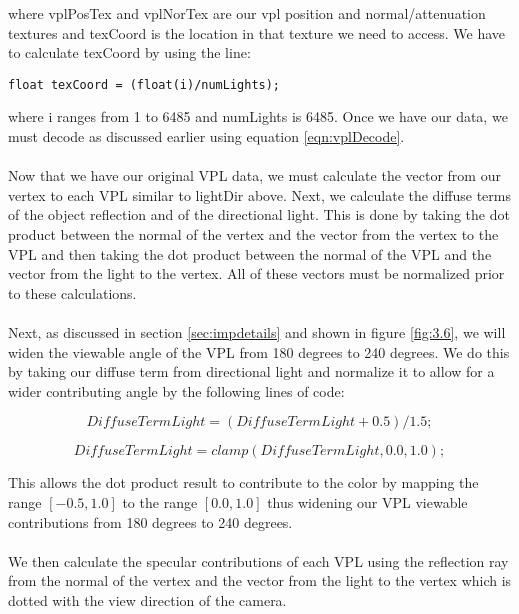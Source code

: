 where vplPosTex and vplNorTex are our vpl position and normal/attenuation textures and texCoord is the location in that texture we need to access.  We have to calculate texCoord by using the line:

\begin{lstlisting}
float texCoord = (float(i)/numLights);
\end{lstlisting}

where i ranges from 1 to 6485 and numLights is 6485.  Once we have our data, we must decode as discussed earlier using equation \ref{eqn:vplDecode}.  

\paragraph{}
Now that we have our original VPL data, we must calculate the vector from our vertex to each VPL similar to lightDir above.  Next, we calculate the diffuse terms of the object reflection and of the directional light.  This is done by taking the dot product between the normal of the vertex and the vector from the vertex to the VPL and then taking the dot product between the normal of the VPL and the vector from the light to the vertex.  All of these vectors must be normalized prior to these calculations.

\paragraph{}
Next, as discussed in section \ref{sec:impdetails} and shown in figure \ref{fig:3.6}, we will widen the viewable angle of the VPL from 180 degrees to 240 degrees.  We do this by taking our diffuse term from directional light and normalize it to allow for a wider contributing angle by the following lines of code:

\begin{equation}
DiffuseTermLight = (DiffuseTermLight + 0.5)/1.5;
\end{equation}

\begin{equation}
DiffuseTermLight = clamp(DiffuseTermLight, 0.0, 1.0);
\end{equation}

This allows the dot product result to contribute to the color by mapping the range $[-0.5, 1.0]$ to the range $[0.0, 1.0]$ thus widening our VPL viewable contributions from 180 degrees to 240 degrees.

\paragraph{}
We then calculate the specular contributions of each VPL using the reflection ray from the normal of the vertex and the vector from the light to the vertex which is dotted with the view direction of the camera.

